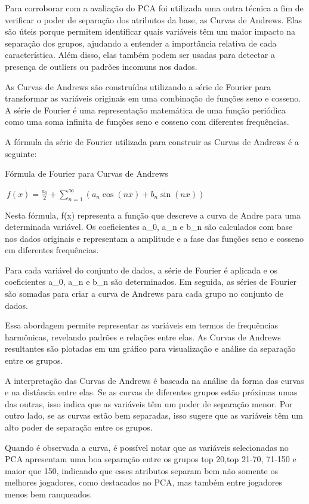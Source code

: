 \documentclass[
]{book}
\begin{document}
Para corroborar com a avaliação do PCA foi utilizada uma outra técnica a fim de verificar o poder de separação dos atributos da base, as Curvas de Andrews. Elas são úteis porque permitem identificar quais variáveis têm um maior impacto na separação dos grupos, ajudando a entender a importância relativa de cada característica. Além disso, elas também podem ser usadas para detectar a presença de outliers ou padrões incomuns nos dados.

As Curvas de Andrews são construídas utilizando a série de Fourier para transformar as variáveis originais em uma combinação de funções seno e cosseno. A série de Fourier é uma representação matemática de uma função periódica como uma soma infinita de funções seno e cosseno com diferentes frequências.

A fórmula da série de Fourier utilizada para construir as Curvas de Andrews é a seguinte:

Fórmula de Fourier para Curvas de Andrews

\(\ f(x) = \frac{a_0}{2} + \sum_{n=1}^{\infty} \left( a_n \cos(nx) + b_n \sin(nx) \right)\)

Nesta fórmula, f(x) representa a função que descreve a curva de Andre para uma determinada variável. Os coeficientes a\_0, a\_n e b\_n são calculados com base nos dados originais e representam a amplitude e a fase das funções seno e cosseno em diferentes frequências.

Para cada variável do conjunto de dados, a série de Fourier é aplicada e os coeficientes a\_0, a\_n e b\_n são determinados. Em seguida, as séries de Fourier são somadas para criar a curva de Andrews para cada grupo no conjunto de dados.

Essa abordagem permite representar as variáveis em termos de frequências harmônicas, revelando padrões e relações entre elas. As Curvas de Andrews resultantes são plotadas em um gráfico para visualização e análise da separação entre os grupos.

A interpretação das Curvas de Andrews é baseada na análise da forma das curvas e na distância entre elas. Se as curvas de diferentes grupos estão próximas umas das outras, isso indica que as variáveis têm um poder de separação menor. Por outro lado, se as curvas estão bem separadas, isso sugere que as variáveis têm um alto poder de separação entre os grupos.

Quando é observada a curva, é possível notar que as variáveis selecionadas no PCA apresentam uma boa separação entre os grupos top 20,top 21-70, 71-150 e maior que 150, indicando que esses atributos separam bem não somente os melhores jogadores, como destacados no PCA, mas também entre jogadores menos bem ranqueados.
\end{document}
